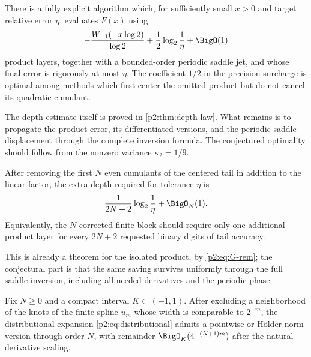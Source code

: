 \documentclass[11pt,oneside]{article}
\numberwithin{equation}{section}
\theoremstyle{definition}
\theoremstyle{remark}
\begin{document}
\begin{conjecture}
\label{p2:conj:endpoint-evaluator}
There is a fully explicit algorithm which, for sufficiently small $x>0$ and target relative
error $\eta$, evaluates $F(x)$ using
\begin{equation}
 -\frac{W_{-1}(-x\log2)}{\log2}
 +\frac12\log_2\frac1\eta+\BigO(1)
 \label{p2:eq:conj-depth}
\end{equation}
product layers, together with a bounded-order periodic saddle jet, and whose final error is
rigorously at most $\eta$.  The coefficient $1/2$ in the precision surcharge is optimal among
methods which first center the omitted product but do not cancel its quadratic cumulant.
\end{conjecture}

The depth estimate itself is proved in \cref{p2:thm:depth-law}.  What remains is to propagate the
product error, its differentiated versions, and the periodic saddle displacement through the
complete inversion formula.  The conjectured optimality should follow from the nonzero
variance $\kappa_2=1/9$.

\begin{conjecture}
\label{p2:conj:cumulant-depth}
After removing the first $N$ even cumulants of the centered tail in addition to the linear
factor, the extra depth required for tolerance $\eta$ is
\begin{equation}
 \frac{1}{2N+2}\log_2\frac1\eta+\BigO_N(1).
 \label{p2:eq:cumulant-depth-conj}
\end{equation}
Equivalently, the $N$-corrected finite block should require only one additional product layer
for every $2N+2$ requested binary digits of tail accuracy.
\end{conjecture}

This is already a theorem for the isolated product, by \eqref{p2:eq:G-rem}; the conjectural part
is that the same saving survives uniformly through the full saddle inversion, including all
needed derivatives and the periodic phase.

\begin{conjecture}
\label{p2:conj:strong-spline}
Fix $N\ge0$ and a compact interval $K\subset(-1,1)$.  After excluding a neighborhood of the
knots of the finite spline $u_m$ whose width is comparable to $2^{-m}$, the distributional
expansion \eqref{p2:eq:distributional} admits a pointwise or Hölder-norm version through order
$N$, with remainder $\BigO_K(4^{-(N+1)m})$ after the natural derivative scaling.
\end{conjecture}
\end{document}
